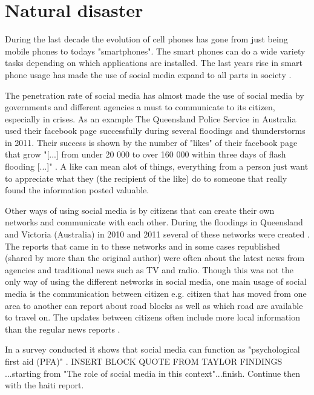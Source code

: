 \section{Natural disaster}
During the last decade the evolution of cell phones has gone from just being mobile phones to todays "smartphones".
The smart phones can do a wide variety tasks depending on which applications are installed.
The last years rise in smart phone usage has made the use of social media expand to all parts in society \cite{taylor2012}.

The penetration rate of social media has almost made the use of social media by governments and different agencies a must to communicate to its citizen, especially in crises.
As an example The Queensland Police Service in Australia used their facebook page successfully during several floodings and thunderstorms in 2011.
Their success is shown by the number of "likes" of their facebook page that grow "[...] from under 20 000 to over 160 000 within three days of flash flooding [...]" \cite{taylor2012}.
A like can mean alot of things, everything from a person just want to appreciate what they (the recipient of the like) do to someone that really found the information posted valuable.

Other ways of using social media is by citizens that can create their own networks and communicate with each other.
During the floodings in Queensland and Victoria (Australia) in 2010 and 2011 several of these networks were created \cite{bird2012}.
The reports that came in to these networks and in some cases republished (shared by more than the original author) were often about the latest news from agencies and traditional news such as TV and radio.
Though this was not the only way of using the different networks in social media, one main usage of social media is the communication between citizen e.g. citizen that has moved from one area to another can report about road blocks as well as which road are available to travel on.
The updates between citizens often include more local information than the regular news reports \cite{bird2012}.

In a survey conducted it shows that social media can function as "psychological first aid (PFA)" \cite{taylor2012}. 
INSERT BLOCK QUOTE FROM TAYLOR FINDINGS ...starting from "The role of social media in this context"...finish. Continue then with the haiti report.

